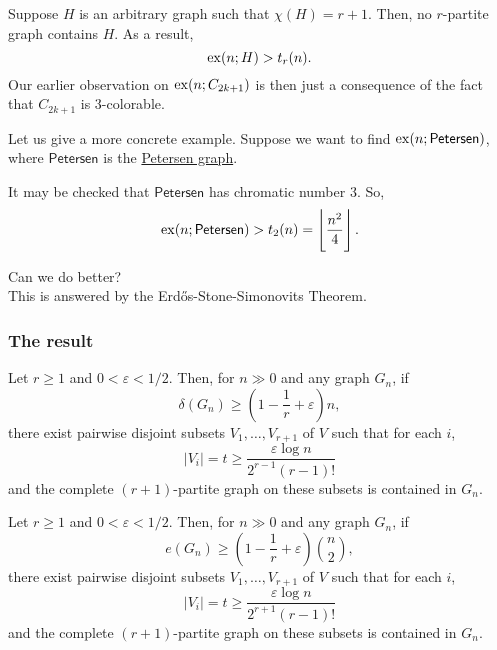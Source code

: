 			Suppose $H$ is an arbitrary graph such that $\chi(H) = r+1$. Then, no $r$-partite graph contains $H$. As a result,
			\[ \operatorname{ex}(n;H) > t_r(n). \]
			Our earlier observation on $\operatorname{ex}(n;C_{2k+1})$ is then just a consequence of the fact that $C_{2k+1}$ is $3$-colorable.

			Let us give a more concrete example. Suppose we want to find $\operatorname{ex}(n;\mathsf{Petersen})$, where $\mathsf{Petersen}$ is the \href{https://en.wikipedia.org/wiki/Petersen_graph}{Petersen graph}.


			It may be checked that $\mathsf{Petersen}$ has chromatic number $3$. So,
			\[ \operatorname{ex}(n;\mathsf{Petersen}) > t_2(n) = \left\lfloor \frac{n^2}{4} \right\rfloor. \]

			Can we do better?\\
			This is answered by the Erd\H{o}s-Stone-Simonovits Theorem.

		\subsubsection{The result}

			\begin{ftheo}
				\label{theo: erdos-stone v1}
				Let $r \ge 1$ and $0 < \varepsilon < 1/2$. Then, for $n\gg 0$ and any graph $G_n$, if
				\begin{equation}
					\label{eqn: erdos-stone v1 condition}
					\delta(G_n) \ge \left(1 - \frac{1}{r} + \varepsilon\right)n,
				\end{equation}
				there exist pairwise disjoint subsets $V_1,\ldots,V_{r+1}$ of $V$ such that for each $i$,
				\[ |V_i| = t \ge \frac{\varepsilon \log n}{2^{r-1}(r-1)!} \]
				and the complete $(r+1)$-partite graph on these subsets is contained in $G_n$.
			\end{ftheo}

			\begin{ftheo}
				\label{theo: erdos-stone v2}
				Let $r \ge 1$ and $0 < \varepsilon < 1/2$. Then, for $n\gg 0$ and any graph $G_n$, if
				\begin{equation}
					\label{eqn: erdos-stone v2 condition}
					e(G_n) \ge \left(1 - \frac{1}{r} + \varepsilon\right)\binom{n}{2},
				\end{equation}
				there exist pairwise disjoint subsets $V_1,\ldots,V_{r+1}$ of $V$ such that for each $i$,
				\[ |V_i| = t \ge \frac{\varepsilon \log n}{2^{r+1}(r-1)!} \]
				and the complete $(r+1)$-partite graph on these subsets is contained in $G_n$.
			\end{ftheo}

